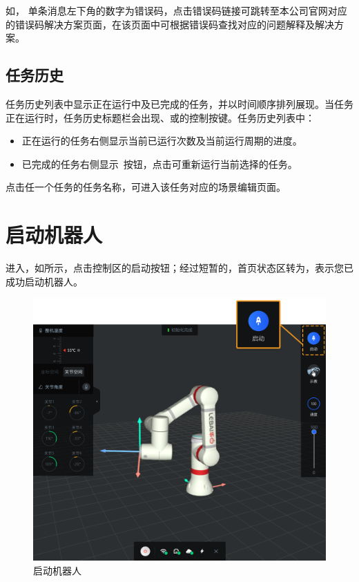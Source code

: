如，
单条消息左下角的数字为错误码，点击错误码链接可跳转至本公司官网对应的错误码解决方案页面，在该页面中可根据错误码查找对应的问题解释及解决方案。

\subsection{任务历史}
\label{sec:任务历史}
任务历史列表中显示正在运行中及已完成的任务，并以时间顺序排列展现。当任务正在运行时，任务历史标题栏会出现、或的控制按键。任务历史列表中：
\begin{itemize}
	\item 正在运行的任务右侧显示当前已运行次数及当前运行周期的进度。
	\item 已完成的任务右侧显示~按钮，点击可重新运行当前选择的任务。
\end{itemize}

点击任一个任务的任务名称，可进入该任务对应的场景编辑页面。



\section{启动机器人}
进入\LM ，如所示，点击控制区的启动按钮；经过短暂的，首页状态区转为，表示您已成功启动机器人。

\begin{figure}[ht]
	\centering
	\includegraphics[width=\textwidth]{screen/2-16.png}
	\caption{启动机器人}
	\label{fig:启动机器人}
\end{figure}

